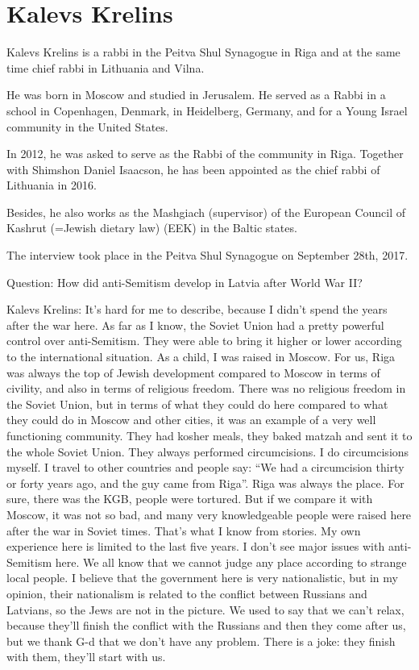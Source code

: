 \section{Kalevs Krelins}

Kalevs Krelins is a rabbi in the Peitva Shul Synagogue in Riga and at the same time chief rabbi in Lithuania and Vilna. 

He was born in Moscow and studied in Jerusalem. He served as a Rabbi in a school in Copenhagen, Denmark, in Heidelberg, Germany, and for a Young Israel community in the United States.  

In 2012, he was asked to serve as the Rabbi of the community in Riga. Together with Shimshon Daniel Isaacson, he has been appointed as the chief rabbi of Lithuania in 2016. 

Besides, he also works as the Mashgiach (supervisor) of the European Council of Kashrut (=Jewish dietary law) (EEK) in the Baltic states. 

The interview took place in the Peitva Shul Synagogue on September 28th, 2017. 

Question: How did anti-Semitism develop in Latvia after World War II?  

Kalevs Krelins: It’s hard for me to describe, because I didn’t spend the years after the war here. As far as I know, the Soviet Union had a pretty powerful control over anti-Semitism. They were able to bring it higher or lower according to the international situation. As a child, I was raised in Moscow. For us, Riga was always the top of Jewish development compared to Moscow in terms of civility, and also in terms of religious freedom. There was no religious freedom in the Soviet Union, but in terms of what they could do here compared to what they could do in Moscow and other cities, it was an example of a very well functioning community. They had kosher meals, they baked matzah and sent it to the whole Soviet Union. They always performed circumcisions. I do circumcisions myself. I travel to other countries and people say: “We had a circumcision thirty or forty years ago, and the guy came from Riga”. Riga was always the place. For sure, there was the KGB, people were tortured. But if we compare it with Moscow, it was not so bad, and many very knowledgeable people were raised here after the war in Soviet times. That’s what I know from stories. My own experience here is limited to the last five years. I don’t see major issues with anti-Semitism here.  We all know that we cannot judge any place according to strange local people. I believe that the government here is very nationalistic, but in my opinion, their nationalism is related to the conflict between Russians and Latvians, so the Jews are not in the picture. We used to say that we can’t relax, because they’ll finish the conflict with the Russians and then they come after us, but we thank G-d that we don’t have any problem. There is a joke: they finish with them, they’ll start with us.  

